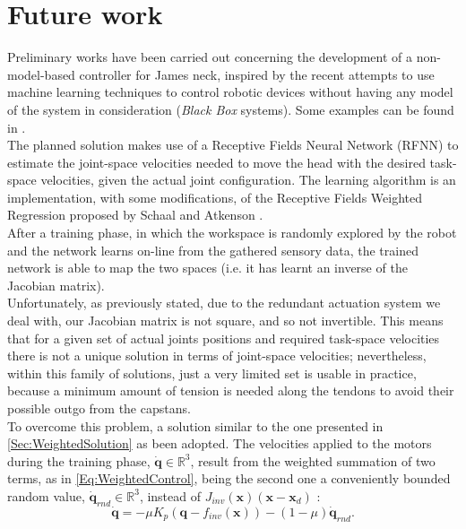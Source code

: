 \documentclass[conference]{IEEEtran}
\numberwithin{equation}{section}
\newcommand{\To}{\longrightarrow}
\newcommand{\q}{\mathbf{q}}
\newcommand{\x}{\mathbf{x}}
\begin{document}
\section{Future work} \label{Sec:FutureWork}

Preliminary works have been carried out concerning the development of a non-model-based controller for James neck, inspired by the recent attempts to use machine learning techniques to control robotic devices without having any model of the system in consideration (\emph{Black Box} systems). Some examples can be found in \cite{Zhang03ann,Iida04rl,Conradt00lwpr,Mahadevan96learn}.\\The planned solution makes use of a Receptive Fields Neural Network (RFNN) to estimate the joint-space velocities needed to move the head with the desired task-space velocities, given the actual joint configuration. The learning algorithm is an implementation, with some modifications, of the Receptive Fields Weighted Regression proposed by Schaal and Atkenson \cite{Schaal98rfwr}.\\After a training phase, in which the workspace is randomly explored by the robot and the network learns on-line from the gathered sensory data, the trained network is able to map the two spaces (i.e. it has learnt an inverse of the Jacobian matrix).\\Unfortunately, as previously stated, due to the redundant actuation system we deal with, our Jacobian matrix is not square, and so not invertible. This means that for a given set of actual joints positions and required task-space velocities there is not a unique solution in terms of joint-space velocities; nevertheless, within this family of solutions, just a very limited set is usable in practice, because a minimum amount of tension is needed along the tendons to avoid their possible outgo from the capstans.\\To overcome this problem, a solution similar to the one presented in \ref{Sec:WeightedSolution} as been adopted. The velocities applied to the motors during the training phase, $\dot{\q} \in\mathbb R^3$, result from the weighted summation of two terms, as in \ref{Eq:WeightedControl}, being the second one a conveniently bounded random value, $\dot{\q}_{rnd} \in\mathbb R^3$, instead of $J_{inv}(\x) (\x - \x_d)$ :
\begin{equation} \label{Eq:RandomVelocities}
\dot{\q} = -\mu K_p(\q - f_{inv}(\x)) - (1-\mu) \dot{\q}_{rnd}.
\end{equation}
\end{document}
